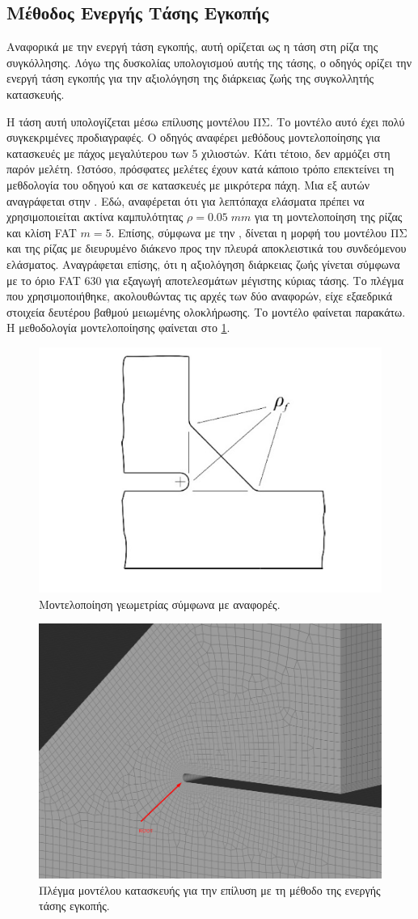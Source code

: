 \documentclass{article}
\begin{document}
\subsection{Μέθοδος Ενεργής Τάσης Εγκοπής}
Αναφορικά με την ενεργή τάση εγκοπής, αυτή ορίζεται ως η τάση στη ρίζα της συγκόλλησης. Λόγω της δυσκολίας υπολογισμού αυτής της τάσης, ο οδηγός ορίζει την ενεργή τάση εγκοπής για την αξιολόγηση της διάρκειας ζωής της συγκολλητής κατασκευής. 
\par Η τάση αυτή υπολογίζεται μέσω επίλυσης μοντέλου ΠΣ. Το μοντέλο αυτό έχει πολύ συγκεκριμένες προδιαγραφές. Ο οδηγός αναφέρει μεθόδους μοντελοποίησης για κατασκευές με πάχος μεγαλύτερου των 5 χιλιοστών. Κάτι τέτοιο, δεν αρμόζει στη παρόν μελέτη. Ωστόσο, πρόσφατες μελέτες έχουν κατά κάποιο τρόπο επεκτείνει τη μεθδολογία του οδηγού και σε κατασκευές με μικρότερα πάχη. Μια εξ αυτών αναγράφεται στην \cite{BAUMGARTNER2020105844}. Εδώ, αναφέρεται ότι για λεπτόπαχα ελάσματα πρέπει να χρησιμοποιείται ακτίνα καμπυλότητας $\rho = 0.05 \;mm$ για τη μοντελοποίηση της ρίζας και κλίση FAT $m=5$. Επίσης, σύμφωνα με την \cite{malik}, δίνεται η μορφή του μοντέλου ΠΣ και της ρίζας με διευρυμένο διάκενο προς την πλευρά αποκλειστικά του συνδεόμενου ελάσματος. Αναγράφεται επίσης, ότι η αξιολόγηση διάρκειας ζωής γίνεται σύμφωνα με το όριο FAT 630 για εξαγωγή αποτελεσμάτων μέγιστης κύριας τάσης. Το πλέγμα που χρησιμοποιήθηκε, ακολουθώντας τις αρχές των δύο αναφορών, είχε εξαεδρικά στοιχεία δευτέρου βαθμού μειωμένης ολοκλήρωσης. Το μοντέλο φαίνεται παρακάτω. Η μεθοδολογία μοντελοποίησης φαίνεται στο \ref{fig:efmodel}.

\begin{figure}[H]
    \centering
    \includegraphics[width = 0.45\linewidth]{media/efmodel.png}
    \caption{Μοντελοποίηση γεωμετρίας σύμφωνα με αναφορές.}
    \label{fig:efmodel}
\end{figure}


\begin{figure}[H]
    \centering
    \includegraphics[width = 0.45\linewidth]{media/gridef.png}
    \caption{Πλέγμα μοντέλου κατασκευής για την επίλυση με τη μέθοδο της ενεργής τάσης εγκοπής.}
    \label{fig:efgrid}
\end{figure}
\end{document}
